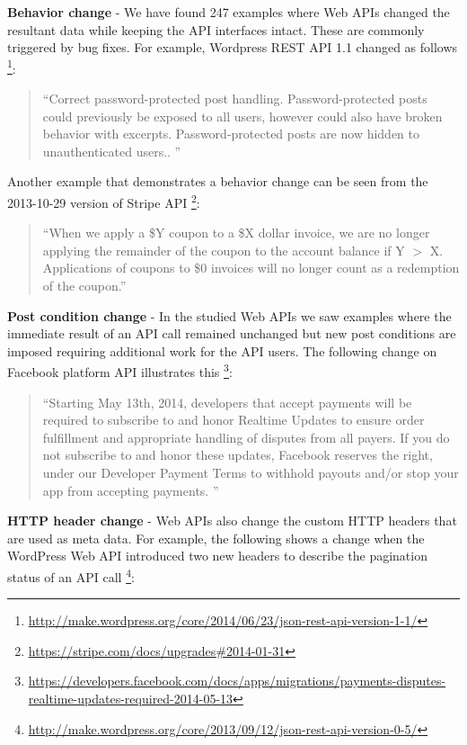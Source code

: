 \documentclass[conference]{IEEEtran}
\begin{document}
\textbf{Behavior change} - We have found 247 examples where Web APIs changed the resultant data while keeping the API interfaces intact. These are commonly triggered by bug fixes. For example, Wordpress REST API 1.1 changed as follows \footnote{\url{http://make.wordpress.org/core/2014/06/23/json-rest-api-version-1-1/}}:

\small
\begin{quotation}
``Correct password-protected post handling.
Password-protected posts could previously be exposed to all users, however
could also have broken behavior with excerpts. Password-protected posts are
now hidden to unauthenticated users..
''\end{quotation}
\normalsize

Another example that demonstrates a behavior change can be seen from the 2013-10-29 version of Stripe API \footnote{\url{https://stripe.com/docs/upgrades#2014-01-31}}:

\small
\begin{quotation}
``When we apply a \$Y coupon to a \$X dollar invoice, we are no longer applying the remainder of the coupon to the account balance if Y $>$ X. Applications of coupons to \$0 invoices will no longer count as a redemption of the coupon.''
\end{quotation}
\normalsize

\textbf{Post condition change} - In the studied Web APIs we saw examples where the immediate result of an API call remained unchanged but new post conditions are imposed requiring additional work for the API users. The following change on Facebook platform API illustrates this \footnote{\url{https://developers.facebook.com/docs/apps/migrations/payments-disputes-realtime-updates-required-2014-05-13}}:

\small
\begin{quotation}
``Starting May 13th, 2014, developers that accept payments will be required to subscribe to and honor Realtime Updates to ensure order fulfillment and appropriate handling of disputes from all payers. If you do not subscribe to and honor these updates, Facebook reserves the right, under our Developer Payment Terms to withhold payouts and/or stop your app from accepting payments.
''\end{quotation}
\normalsize

\textbf{HTTP header change} - Web APIs also change the custom HTTP headers that are used as meta data. For example, the following shows a change when the WordPress Web API introduced two new headers to describe the pagination status of an API call \footnote{\url{http://make.wordpress.org/core/2013/09/12/json-rest-api-version-0-5/}}:
\end{document}
